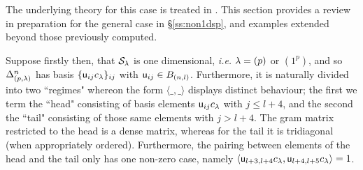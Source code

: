 The underlying theory for this case is treated in \cite{KadarYu,ShBr}. 
This section provides a review in preparation for the general case in \S\ref{ss:non1dsp}, 
and examples extended beyond those previously computed. 

\medskip 

Suppose firstly 
then, 
that $\mathcal{S}_\lambda$ is one dimensional, \textit{i.e.} $\lambda=(p)$ or $(1^p)$, and so $\Delta_{(p,\lambda)}^{n}$ has basis 
$\{ {\mathsf u}_{ij} c_{\lambda} \}_{ij}$ with ${\mathsf u}_{ij}\in B_{(n,l)}$. 
Furthermore, it is naturally divided into two ``regimes" whereon the form $\langle \_ , \_ \rangle$ displays distinct behaviour; the first we term the ``head" consisting of basis elements $ {\mathsf u}_{ij} c_{\lambda}$ with $j\leq l+4$, and the second the ``tail" consisting of those same elements with $j>l+4$. The gram matrix restricted to the head is a dense matrix, whereas for the tail it is tridiagonal (when appropriately ordered). Furthermore, the pairing between elements of the head and the tail only has one non-zero case, namely $\langle {\mathsf u}_{l+3,l+4} c_{\lambda}, {\mathsf u}_{l+4,l+5} c_{\lambda} \rangle=1$.

